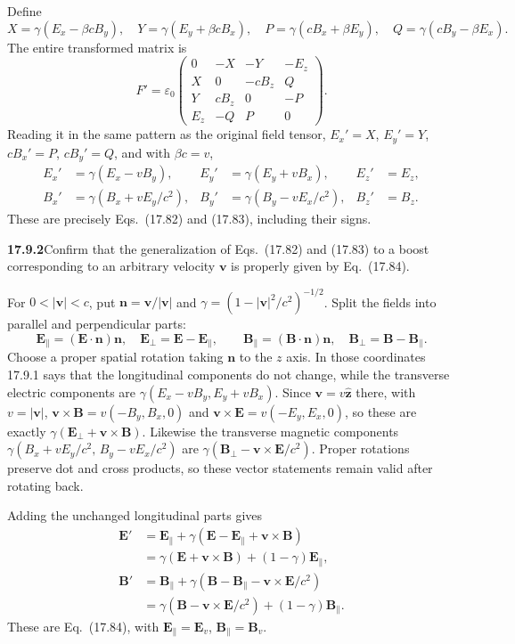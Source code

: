 Define
\[
X=\gamma(E_x-\beta cB_y),\quad
Y=\gamma(E_y+\beta cB_x),\quad
P=\gamma(cB_x+\beta E_y),\quad
Q=\gamma(cB_y-\beta E_x).
\]
The entire transformed matrix is
\[
F'=\varepsilon_0
\begin{pmatrix}
0&-X&-Y&-E_z\\
X&0&-cB_z&Q\\
Y&cB_z&0&-P\\
E_z&-Q&P&0
\end{pmatrix}.
\]
Reading it in the same pattern as the original field tensor,
$E_x'=X$, $E_y'=Y$, $cB_x'=P$, $cB_y'=Q$, and with $\beta c=v$,
\[
\boxed{\begin{aligned}
E_x'&=\gamma(E_x-vB_y),&
E_y'&=\gamma(E_y+vB_x),&
E_z'&=E_z,\\
B_x'&=\gamma(B_x+vE_y/c^2),&
B_y'&=\gamma(B_y-vE_x/c^2),&
B_z'&=B_z.
\end{aligned}}
\]
These are precisely Eqs.~(17.82) and (17.83), including their signs.

\par\bigskip
\noindent\textbf{17.9.2}\quad Confirm that the generalization of
Eqs.~(17.82) and (17.83) to a boost corresponding to an arbitrary
velocity $\mathbf v$ is properly given by Eq.~(17.84).
\par{}
\solution
For $0<|\mathbf v|<c$, put
$\mathbf n=\mathbf v/|\mathbf v|$ and $\gamma=(1-|\mathbf v|^2/c^2)^{-1/2}$.
Split the fields into
parallel and perpendicular parts:
\[
\mathbf E_\parallel=(\mathbf E\cdot\mathbf n)\mathbf n,\quad
\mathbf E_\perp=\mathbf E-\mathbf E_\parallel,\qquad
\mathbf B_\parallel=(\mathbf B\cdot\mathbf n)\mathbf n,\quad
\mathbf B_\perp=\mathbf B-\mathbf B_\parallel.
\]
Choose a proper spatial rotation taking $\mathbf n$ to the
$z$ axis. In those coordinates 17.9.1 says that the longitudinal
components do not change, while the transverse electric components
are $\gamma(E_x-vB_y,E_y+vB_x)$.
Since $\mathbf v=v\hat{\mathbf z}$ there, with $v=|\mathbf v|$,
$\mathbf v\times\mathbf B=v(-B_y,B_x,0)$ and
$\mathbf v\times\mathbf E=v(-E_y,E_x,0)$, so these are exactly
$\gamma(\mathbf E_\perp+\mathbf v\times\mathbf B)$.
Likewise the transverse magnetic components
$\gamma(B_x+vE_y/c^2,\,B_y-vE_x/c^2)$ are
$\gamma(\mathbf B_\perp-\mathbf v\times\mathbf E/c^2)$.
Proper rotations preserve dot and cross products, so these vector
statements remain valid after rotating back.

Adding the unchanged longitudinal parts gives
\[
\begin{aligned}
\mathbf E'
&=\mathbf E_\parallel+
\gamma(\mathbf E-\mathbf E_\parallel+\mathbf v\times\mathbf B)\\
&=\boxed{\gamma(\mathbf E+\mathbf v\times\mathbf B)
+(1-\gamma)\mathbf E_\parallel},\\
\mathbf B'
&=\mathbf B_\parallel+
\gamma(\mathbf B-\mathbf B_\parallel-\mathbf v\times\mathbf E/c^2)\\
&=\boxed{\gamma(\mathbf B-\mathbf v\times\mathbf E/c^2)
+(1-\gamma)\mathbf B_\parallel}.
\end{aligned}
\]
These are Eq.~(17.84), with $\mathbf E_\parallel=\mathbf E_v$,
$\mathbf B_\parallel=\mathbf B_v$.

